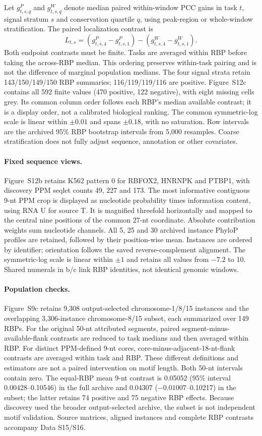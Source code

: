 \documentclass[11pt]{article}
\begin{document}
Let $g^{P}_{t,s,q}$ and $g^{W}_{t,s,q}$ denote median paired within-window PCC gains in task $t$, signal stratum $s$ and conservation quartile $q$, using peak-region or whole-window stratification. The paired localization contrast is
\[
L_{t,s}=(g^{P}_{t,s,4}-g^{P}_{t,s,1})-(g^{W}_{t,s,4}-g^{W}_{t,s,1}).
\]
Both endpoint contrasts must be finite. Tasks are averaged within RBP before taking the across-RBP median. This ordering preserves within-task pairing and is not the difference of marginal population medians. The four signal strata retain 143/150/149/150 RBP summaries; 116/119/119/116 are positive. Figure~S12c contains all 592 finite values (470 positive, 122 negative), with eight missing cells grey. Its common column order follows each RBP's median available contrast; it is a display order, not a calibrated biological ranking. The common symmetric-log scale is linear within $\pm0.01$ and spans $\pm0.18$, with no saturation. Row intervals are the archived 95\% RBP bootstrap intervals from 5,000 resamples. Coarse stratification does not fully adjust sequence, annotation or other covariates.

\paragraph{Fixed sequence views.} Figure~S12b retains K562 pattern 0 for RBFOX2, HNRNPK and PTBP1, with discovery PPM seqlet counts 49, 227 and 173. The most informative contiguous 9-nt PPM crop is displayed as nucleotide probability times information content, using RNA U for source T. It is magnified threefold horizontally and mapped to the central nine positions of the common 27-nt coordinate. Absolute contribution weights sum nucleotide channels. All 5, 25 and 30 archived instance PhyloP profiles are retained, followed by their position-wise mean. Instances are ordered by identifier; orientation follows the saved reverse-complement alignment. The symmetric-log scale is linear within $\pm1$ and retains all values from $-7.2$ to 10. Shared numerals in b/c link RBP identities, not identical genomic windows.

\paragraph{Population checks.} Figure~S9c retains 9,308 output-selected chromosome-1/8/15 instances and the overlapping 3,306-instance chromosome-8/15 subset, each summarized over 149 RBPs. For the original 50-nt attributed segments, paired segment-minus-available-flank contrasts are reduced to task medians and then averaged within RBP. For distinct PPM-defined 9-nt cores, core-minus-adjacent-18-nt-flank contrasts are averaged within task and RBP. These different definitions and estimators are not a paired intervention on motif length. Both 50-nt intervals contain zero. The equal-RBP mean 9-nt contrast is 0.05052 (95\% interval 0.00428--0.10546) in the full archive and 0.04307 ($-0.01007$--0.10217) in the subset; the latter retains 74 positive and 75 negative RBP effects. Because discovery used the broader output-selected archive, the subset is not independent motif validation. Source matrices, aligned instances and complete RBP contrasts accompany Data S15/S16.
\end{document}
